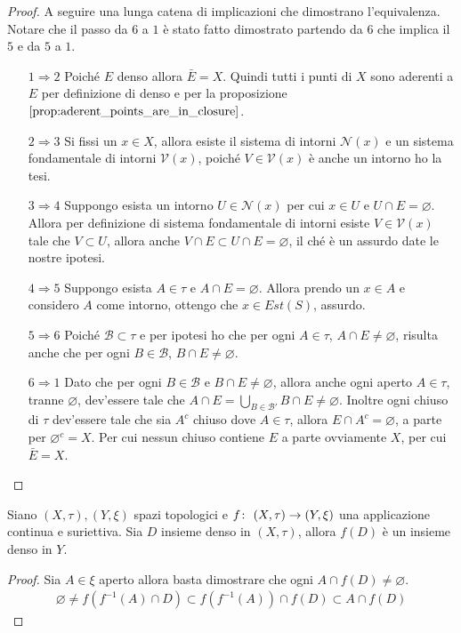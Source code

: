 \begin{proof}
	A seguire una lunga catena di implicazioni che dimostrano l'equivalenza. Notare che il passo da $6$ a $1$ è stato fatto dimostrato partendo da $6$ che implica il $5$ e da $5$ a $1$.
	\begin{enumerate}
		\item[$1 \Rightarrow 2$] Poiché $E$ denso allora $\bar{E} = X$. Quindi tutti i punti di $X$ sono aderenti a $E$ per definizione di denso e per la proposizione $\ref{prop:aderent_points_are_in_closure}$.
		\item[$2 \Rightarrow 3$] Si fissi un $x \in X$, allora esiste il sistema di intorni $\mathcal{N}(x)$ e un sistema fondamentale di intorni $\mathcal{V}(x)$, poiché $V \in \mathcal{V}(x)$ è anche un intorno ho la tesi.
		\item[$3 \Rightarrow 4$] Suppongo esista un intorno $U \in \mathcal{N}(x)$ per cui $x \in U$ e $U \cap E = \varnothing$. Allora per definizione di sistema fondamentale di intorni esiste $V \in \mathcal{V}(x)$ tale che $V \subset U$, allora anche $V \cap E \subset U \cap E = \varnothing$, il ché è un assurdo date le nostre ipotesi.  
		\item[$4 \Rightarrow 5$] Suppongo esista $A \in \tau$ e $A \cap E = \varnothing$. Allora prendo un $x \in A$ e considero $A$ come intorno, ottengo che $x \in Est(S)$, assurdo.  
		\item[$5 \Rightarrow 6$] Poiché $\mathcal{B} \subset \tau$ e per ipotesi ho che per ogni $A \in \tau$, $A \cap E \neq \varnothing$, risulta anche che per ogni $B \in \mathcal{B}$, $B \cap E \neq \varnothing$.
		\item[$6 \Rightarrow 1$] Dato che per ogni $B \in \mathcal{B}$ e $B \cap E \neq \varnothing$, allora anche ogni aperto $A \in \tau$, tranne $\varnothing$, dev'essere tale che $ A \cap E = \bigcup_{B \in \mathcal{B}'} B \cap E \neq \varnothing$. Inoltre ogni chiuso di $\tau$ dev'essere tale che sia $A^c$ chiuso dove $A \in \tau$, allora $E \cap A^c = \varnothing$, a parte per $\varnothing^c = X$. Per cui nessun chiuso contiene $E$ a parte ovviamente $X$, per cui $\bar{E} = X$.
	\end{enumerate}
\end{proof}

\begin{theorem}
	Siano $(X,\tau), (Y, \xi)$ spazi topologici e $f \colon\ (X,\tau) \rightarrow (Y,\xi)$ una applicazione continua e suriettiva. Sia $D$ insieme denso in $(X,\tau)$, allora $f(D)$ è un insieme denso in $Y$.
\end{theorem}
\begin{proof}
	Sia $A \in \xi$ aperto allora basta dimostrare che ogni $A \cap f(D) \neq \varnothing$. 
	\begin{equation}
	\begin{aligned}
		\varnothing \neq f(f^{-1}(A) \cap D) \subset f(f^{-1}(A)) \cap f(D) \subset A \cap f(D) 
	\end{aligned}
	\end{equation}
\end{proof}

